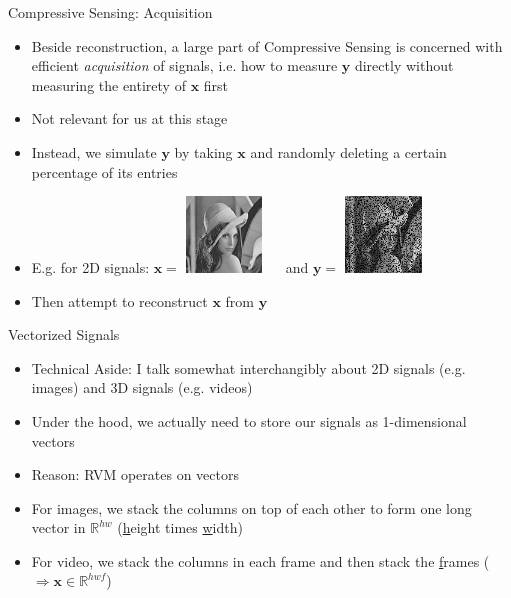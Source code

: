 \documentclass[xcolor=table]{beamer}
\numberwithin{equation}{section}
\let\bs\boldsymbol
\begin{document}
\begin{frame}{Compressive Sensing: Acquisition}
\begin{itemize}%
\item Beside reconstruction, a large part of Compressive Sensing is concerned with efficient \emph{acquisition} of signals, i.e. how to measure $\bs y$ directly without measuring the entirety of $\bs x$ first
\item Not relevant for us at this stage
\item Instead, we simulate $\bs y$ by taking $\bs x$ and randomly deleting a certain percentage of its entries
\item E.g. for 2D signals: $\bs x = $ \includegraphics[width = 0.8in]{128.png} $\quad$ and $\bs y = $ \includegraphics[width=0.8in]{0.png}
\item Then attempt to reconstruct $\bs x$ from $\bs y$
\end{itemize}
\end{frame}

\begin{frame}{Vectorized Signals}
\begin{itemize}%
\item Technical Aside: I talk somewhat interchangibly about 2D signals (e.g. images) and 3D signals (e.g. videos)
\item Under the hood, we actually need to store our signals as 1-dimensional vectors
\item Reason: RVM operates on vectors
\item For images, we stack the columns on top of each other to form one long vector in $\mathbb{R}^{hw}$ (\underline{h}eight times \underline{w}idth)
\item For video, we stack the columns in each frame and then stack the \underline{f}rames ($\Rightarrow \bs x \in \mathbb{R}^{hwf}$)
\end{itemize}
\end{frame}
\end{document}
